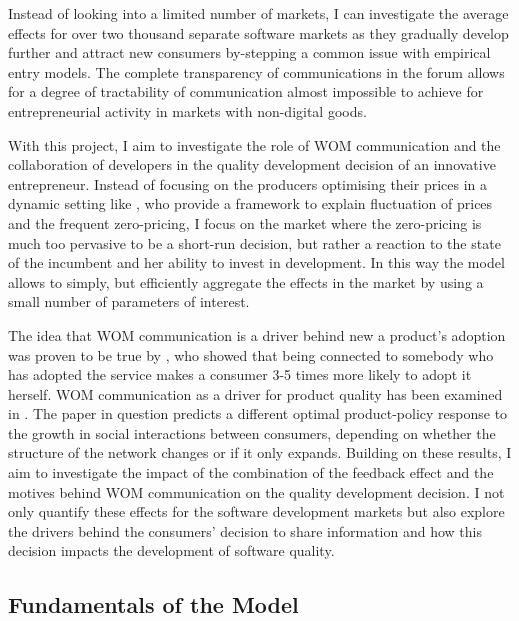 \documentclass[13pt]{article}
\numberwithin{figure}{section}
\numberwithin{table}{section}
\theoremstyle{indented}
\numberwithin{equation}{section} %
\begin{document}
Instead of looking into a limited number of markets, I can investigate the average effects for over two thousand separate software markets as they gradually develop further and attract new consumers by-stepping a common issue with empirical entry models. The complete transparency of communications in the forum allows for a degree of tractability of communication almost impossible to achieve for entrepreneurial activity in markets with non-digital goods. 

With this project, I aim to investigate the role of WOM communication and the collaboration of developers in the quality development decision of an innovative entrepreneur. Instead of focusing on the producers optimising their prices in a dynamic setting like \citet{Ajorlou2018}, who provide a framework to explain fluctuation of prices and the frequent zero-pricing, I focus on the market where the zero-pricing is much too pervasive to be a short-run decision, but rather a reaction to the state of the incumbent and her ability to invest in development. In this way the model allows to simply, but efficiently aggregate the effects in the market by using a small number of parameters of interest.

The idea that WOM communication is a driver behind new a product's adoption was proven to be true by \citet{Hill2006}, who showed that being connected to somebody who has adopted the service makes a consumer 3-5 times more likely to adopt it herself. WOM communication as a driver for product quality has been examined in \citet{Godes2017}. The paper in question predicts a different optimal product-policy response to the growth in social interactions between consumers, depending on whether the structure of the network changes or if it only expands. Building on these results, I aim to investigate the impact of the combination of the feedback effect and the motives behind WOM communication on the quality development decision. I not only quantify these effects for the software development markets but also explore the drivers behind the consumers' decision to share information and how this decision impacts the development of software quality.










\subsection{Fundamentals of the Model} \label{model}
 
\end{document}
